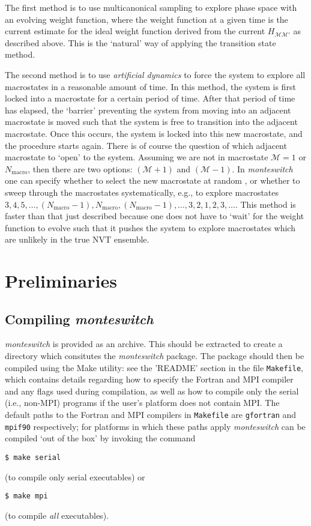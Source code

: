 \documentclass{report}
\begin{document}
The first method is to use multicanonical sampling to explore phase space with an evolving weight function, where the weight function
at a given time is the current estimate for the ideal weight function derived from the current $H_{\mathcal{M}\mathcal{M}'}$ as described above.
This is the `natural' way of applying the transition state method.

The second method is to use \emph{artificial dynamics} to force the system to explore all macrostates in a reasonable amount of time. In this
method, the system is first locked into a macrostate for a certain period of time. After that period of time has elapsed, the `barrier' preventing
the system from moving into an adjacent macrostate is moved such that the system is free to transition into the adjacent macrostate. Once this occurs,
the system is locked into this new macrostate, and the procedure starts again. There is of course the question of which adjacent macrostate to `open'
to the system. Assuming we are not in macrostate $\mathcal{M}=1$ or $N_{\text{macro}}$, then there are two options: $(\mathcal{M}+1)$ and $(\mathcal{M}-1)$.
In \emph{monteswitch} one can specify whether to select the new macrostate at random \cite{thesis:Jackson}, 
or whether to sweep through the macrostates systematically, e.g.,
to explore macrostates $3,4,5,\dotsc,(N_{\text{macro}}-1),N_{\text{macro}},(N_{\text{macro}}-1),\dotsc,3,2,1,2,3,\dotsc$. This method is faster than that
just described because one does not have to `wait' for the weight function to evolve such that it pushes the system to explore macrostates which
are unlikely in the true NVT ensemble.


\chapter{Preliminaries}\label{chapter:preliminaries}

\section{Compiling \emph{monteswitch}}
\emph{monteswitch} is provided as an archive. This should be extracted to create a directory which consitutes the \emph{monteswitch} package. The 
package should then be compiled using the Make utility: see the 'README' section in the file \texttt{Makefile}, which contains details regarding how to
specify the Fortran and MPI compiler and any flags used during compilation, as well as how to compile only the serial (i.e., non-MPI) programs
if the user's platform does not contain MPI.
The default paths to the Fortran and MPI compilers in \texttt{Makefile} are \texttt{gfortran} and \texttt{mpif90} respectively; for platforms in which
these paths apply \emph{monteswitch} can be compiled `out of the box' by invoking the command 
\begin{verbatim}
$ make serial
\end{verbatim} 
(to compile only serial executables) or 
\begin{verbatim}
$ make mpi
\end{verbatim}
(to compile \emph{all} executables).
\end{document}
